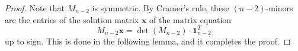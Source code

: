 \documentclass[11pt,reqno]{amsart}
\newcommand\scalemath[2]{\scalebox{#1}{\mbox{\ensuremath{\displaystyle #2}}}}
\theoremstyle{definition}
\theoremstyle{plain}
\begin{document}
\begin{proof}
Note that $M_{n-2}$ is symmetric. 
By Cramer's rule, these $(n-2)$-minors are the entries of the solution matrix $\mathbf{x}$ of the matrix equation
\begin{equation*}
	M_{n-2} \mathbf{x} 
	= \det(M_{n-2}) \cdot \mathbf{1}_{n-2}^T
\end{equation*}
up to sign.
This is done in the following lemma, and it completes the proof.

\end{proof}
\end{document}
